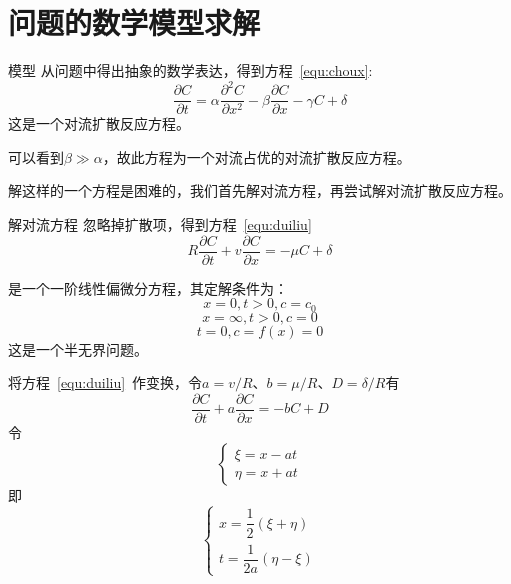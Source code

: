\documentclass[xcolor=dvipsnames]{beamer}
\begin{document}
\section{问题的数学模型求解}
\begin{frame}{模型}
从问题中得出抽象的数学表达，得到方程~\ref{equ:choux}:
\begin{equation}\label{equ:choux}
	\dfrac{\partial C}{\partial t}= \alpha\dfrac{\partial^2 C}{\partial x^2}-\beta\dfrac{\partial C}{\partial x}-\gamma C + \delta
\end{equation}
这是一个对流扩散反应方程。\par
可以看到$\beta\gg\alpha$，故此方程为一个对流占优的对流扩散反应方程。\par
解这样的一个方程是困难的，我们首先解对流方程，再尝试解对流扩散反应方程。
\end{frame}
\begin{frame}{解对流方程}
忽略掉扩散项，得到方程~\ref{equ:duiliu}
\begin{equation}\label{equ:duiliu}
R\dfrac{\partial C}{\partial t}+v\dfrac{\partial C}{\partial x}= -\mu C + \delta
\end{equation}\par
是一个一阶线性偏微分方程，其定解条件为：
\begin{equation}\label{equ:duiliu_bj}
x=0,t>0,c=c_0
\end{equation}
\begin{equation}
x=\infty,t>0,c=0
\end{equation}
\begin{equation}\label{equ:duiliu_init}
t=0,c=f(x)=0
\end{equation}
这是一个半无界问题。\par
\end{frame}
\begin{frame}
将方程~\ref{equ:duiliu}~作变换，令$a=v/R$、$b=\mu/R$、$D=\delta/R$有
\begin{equation}\label{equ:duiliu_n}
\dfrac{\partial C}{\partial t}+a\dfrac{\partial C}{\partial x}= -b C + D
\end{equation}
令
\begin{equation}\label{equ:duiliu_ys}
\begin{cases}
\xi=x-at \\
\eta=x+at
\end{cases}
\end{equation}
即
\begin{equation}
\begin{cases}
x=\dfrac{1}{2}(\xi+\eta)\\[1.2em]
t=\dfrac{1}{2a}(\eta-\xi)
\end{cases}
\end{equation}
\end{frame}
\end{document}
